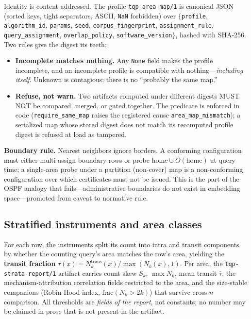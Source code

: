 \documentclass[sigconf, nonacm]{acmart}
\begin{document}
Identity is content-addressed. The profile \texttt{tqp-area-map/1} is
canonical JSON (sorted keys, tight separators, ASCII, \texttt{NaN}
forbidden) over
$\{$\texttt{profile}, \texttt{algorithm\_id}, \texttt{params},
\texttt{seed}, \texttt{corpus\_\allowbreak fingerprint},
\texttt{assignment\_\allowbreak rule},
\texttt{query\_\allowbreak assignment},
\texttt{overlap\_\allowbreak policy},
\texttt{software\_\allowbreak version}$\}$, hashed with SHA-256. Two rules give the
digest its teeth:

\begin{itemize}
\item \textbf{Incomplete matches nothing.} Any \texttt{None} field makes
the profile incomplete, and an incomplete profile is compatible with
nothing---\emph{including itself}. Unknown is contagious; there is no
``probably the same map.''
\item \textbf{Refuse, not warn.} Two artifacts computed under different
digests MUST NOT be compared, merged, or gated together. The predicate is
enforced in code (\texttt{require\_same\_map} raises the registered cause
\texttt{area\_map\_mismatch}); a serialized map whose stored digest does
not match its recomputed profile digest is refused at load as tampered.
\end{itemize}

\textbf{Boundary rule.} Nearest neighbors ignore borders. A conforming
configuration must either multi-assign boundary rows or probe
$\mathrm{home} \cup O(\mathrm{home})$ at query time; a single-area probe
under a partition (non-cover) map is a non-conforming configuration over
which certificates must not be issued. This is the part of the OSPF
analogy that fails---administrative boundaries do not exist in embedding
space---promoted from caveat to normative rule.

\subsection{Stratified instruments and area classes}
\label{sec:instruments}

For each row, the instruments split its count into intra and transit
components by whether the counting query's area matches the row's area,
yielding the \textbf{transit fraction}
$\tau(x) = N_k^{\mathrm{trans}}(x)/\max(N_k(x),1)$. Per area, the
\texttt{tqp-strata-report/1} artifact carries count skew $S_k$,
$\max N_k$, mean transit $\bar\tau$, the mechanism-attribution correlation
fields restricted to the area, and the size-stable companions (Robin Hood
index, $\mathrm{frac}(N_k > 2k)$) that survive cross-$n$ comparison. All
thresholds are \emph{fields of the report}, not constants; no number may
be claimed in prose that is not present in the artifact.
\end{document}
